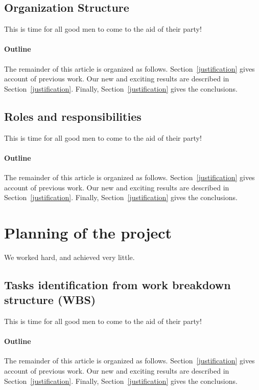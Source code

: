 \documentclass[12pt, titlepage]{article}
\begin{document}
\subsection{Organization Structure}
This is time for all good men to come to the aid of their party!

\paragraph{Outline}
The remainder of this article is organized as follows.
Section~\ref{justification} gives account of previous work.
Our new and exciting results are described in Section~\ref{justification}.
Finally, Section~\ref{justification} gives the conclusions.

\subsection{Roles and responsibilities}

This is time for all good men to come to the aid of their party!

\paragraph{Outline}
The remainder of this article is organized as follows.
Section~\ref{justification} gives account of previous work.
Our new and exciting results are described in Section~\ref{justification}.
Finally, Section~\ref{justification} gives the conclusions.

\section{Planning of the project}
We worked hard, and achieved very little.
\subsection{Tasks identification from work breakdown structure (WBS)}
This is time for all good men to come to the aid of their party!

\paragraph{Outline}
The remainder of this article is organized as follows.
Section~\ref{justification} gives account of previous work.
Our new and exciting results are described in Section~\ref{justification}.
Finally, Section~\ref{justification} gives the conclusions.
\end{document}

